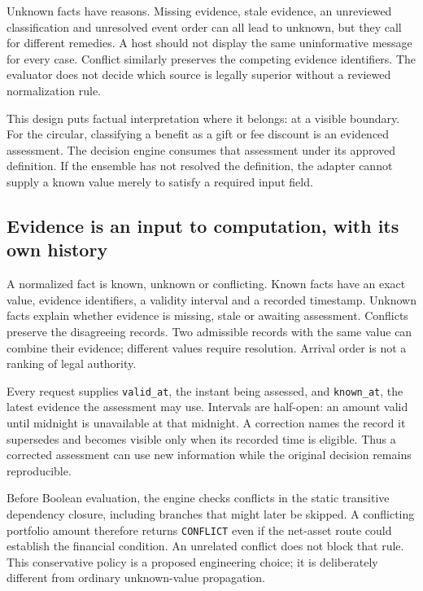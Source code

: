 \documentclass[12pt,a4paper,oneside,openany]{book}
\begin{document}
Unknown facts have reasons. Missing evidence, stale evidence, an unreviewed
classification and unresolved event order can all lead to unknown, but they call
for different remedies. A host should not display the same uninformative message
for every case. Conflict similarly preserves the competing evidence identifiers.
The evaluator does not decide which source is legally superior without a
reviewed normalization rule.

This design puts factual interpretation where it belongs: at a visible boundary.
For the circular, classifying a benefit as a gift or fee discount is an evidenced
assessment. The decision engine consumes that assessment under its approved
definition. If the ensemble has not resolved the definition, the adapter cannot
supply a known value merely to satisfy a required input field.

\subsection{Evidence is an input to computation, with its own history}
\label{merge:P-03a-rule-contract:01}


A normalized fact is known, unknown or conflicting. Known facts have an exact
value, evidence identifiers, a validity interval and a recorded timestamp.
Unknown facts explain whether evidence is missing, stale or awaiting assessment.
Conflicts preserve the disagreeing records. Two admissible records with the
same value can combine their evidence; different values require resolution.
Arrival order is not a ranking of legal authority.

Every request supplies \texttt{valid\_at}, the instant being assessed, and
\texttt{known\_at}, the latest evidence the assessment may use. Intervals are
half-open: an amount valid until midnight is unavailable at that midnight.
A correction names the record it supersedes and becomes visible only when its
recorded time is eligible. Thus a corrected assessment can use new information
while the original decision remains reproducible.

Before Boolean evaluation, the engine checks conflicts in the static transitive
dependency closure, including branches that might later be skipped. A conflicting
portfolio amount therefore returns \texttt{CONFLICT} even if the net-asset route
could establish the financial condition. An unrelated conflict does not block
that rule. This conservative policy is a proposed engineering choice; it is
deliberately different from ordinary unknown-value propagation.
\end{document}
